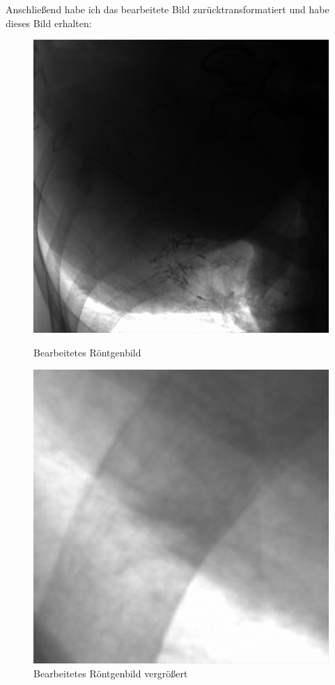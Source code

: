 \documentclass[a4paper,12pt]{article}
\theoremstyle{definition}
\theoremstyle{remark}
\begin{document}
Anschließend habe ich das bearbeitete Bild zurücktransformatiert und habe dieses Bild erhalten:

\begin{figure}[H]
  \centering
  \begin{minipage}{0.49\textwidth}
    \centering
    \includegraphics[width=\linewidth]{Bilder/edited.png}
    \caption{Bearbeitetes Röntgenbild}
    \label{fig:bild1}
  \end{minipage}
  \hfill
  \begin{minipage}{0.49\textwidth}
    \centering
    \includegraphics[width=\linewidth]{Bilder/edited_zoomed.png}
    \caption{Bearbeitetes Röntgenbild vergrößert}
    \label{fig:bild2}
  \end{minipage}
\end{figure}
        
\end{document}

